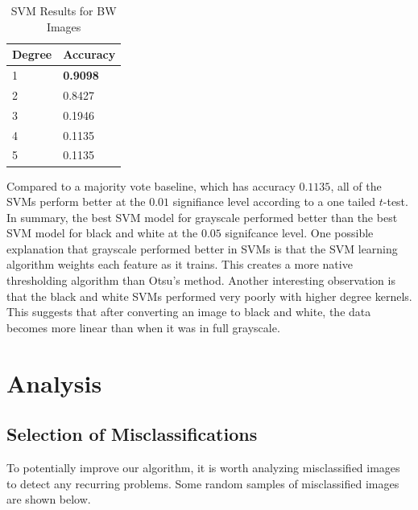 \documentclass[12pt]{article}
\begin{document}
\begin{table}[ht!]
\centering
\caption{SVM Results for BW Images}
    \begin{tabular}{|l|l|}
    \hline
    Degree & Accuracy \\ \hline
    1      & \textbf{0.9098}   \\ \hline
    2      & 0.8427   \\ \hline
    3      & 0.1946   \\ \hline
    4      & 0.1135   \\ \hline
    5      & 0.1135   \\ \hline
    \end{tabular}
\end{table}

Compared to a majority vote baseline, which has accuracy $0.1135$, all of the SVMs perform better at the $0.01$ signifiance level according to a one tailed $t$-test. In summary, the best SVM model for grayscale performed better than the best SVM model for black and white at the $0.05$ signifcance level. One possible explanation that grayscale performed better in SVMs is that the SVM learning algorithm weights each feature as it trains. This creates a more native thresholding algorithm than Otsu's method. Another interesting observation is that the black and white SVMs performed very poorly with higher degree kernels. This suggests that after converting an image to black and white, the data becomes more linear than when it was in full grayscale.

\section*{Analysis}
\subsection*{Selection of Misclassifications}
To potentially improve our algorithm, it is worth analyzing misclassified images to detect any recurring problems. Some random samples of misclassified images are shown below.
\end{document}
